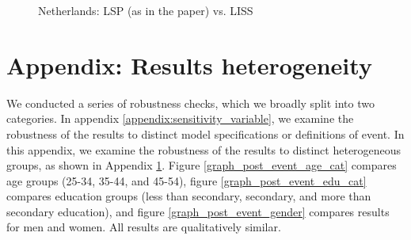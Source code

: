 \begin{figure}
    \caption{Netherlands: LSP (as in the paper) vs. LISS}
    \label{graph_sensitivity_NE}
\end{figure}



\clearpage
\setcounter{table}{0}
\setcounter{figure}{0}
\renewcommand*\thetable{\Alph{section}.\arabic{table}}
\renewcommand*\thefigure{\Alph{section}.\arabic{figure}}
\renewcommand{\theHfigure}{\Alph{section}.\arabic{table}}
\renewcommand{\theHtable}{\Alph{section}.\arabic{figure}}

\section{Appendix: Results heterogeneity}\label{appendix:sensitivity_heterogeneity}

We conducted a series of robustness checks, which we broadly split into two categories.  In appendix \ref{appendix:sensitivity_variable}, we examine the robustness of the results to distinct model specifications or definitions of event.  In this appendix, we examine the robustness of the results to distinct heterogeneous groups, as shown in Appendix \ref{appendix:sensitivity_heterogeneity}.  Figure \ref{graph_post_event_age_cat} compares age groups (25-34, 35-44, and 45-54), figure \ref{graph_post_event_edu_cat} compares education groups (less than secondary, secondary, and more than secondary education), and figure \ref{graph_post_event_gender} compares results for men and women.  All results are qualitatively similar.


